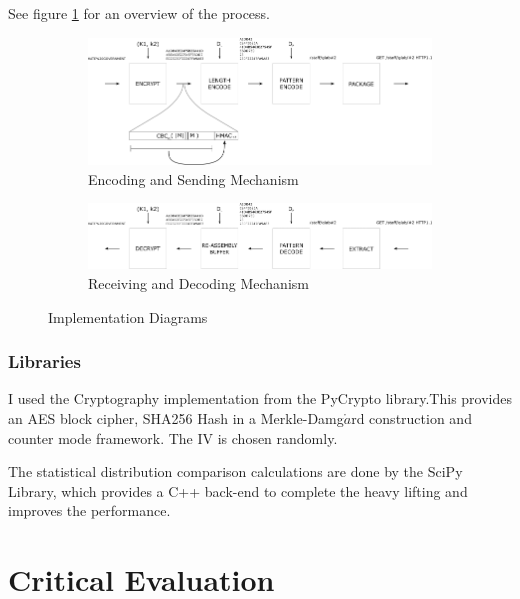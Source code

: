 \documentclass[ %
                    author={Samuel Russell},
                supervisor={Prof. Bogdan Warinschi},
                    degree={MEng},
                     title={Innocuous Ciphertexts},
                  subtitle={The DE-CENSOR Scheme},
                      type={research},
                      year={2018} ]{dissertation}
\begin{document}
See figure \ref{fig:imp-diag} for an overview of the process.

\begin{figure}
\begin{subfigure}[b]{\textwidth}
\includegraphics[scale=0.9]{diagram-enc}
\caption{Encoding and Sending Mechanism}
\end{subfigure}

\begin{subfigure}[b]{\textwidth}
\includegraphics[scale=0.9]{diagram-dec}
\caption{Receiving and Decoding Mechanism}
\end{subfigure}
\caption{Implementation Diagrams}
\label{fig:imp-diag}
\end{figure}

\subsection{Libraries}

I used the Cryptography implementation from the PyCrypto library.This provides an AES block cipher, SHA256 Hash in a Merkle-Damg$\mathring{a}$rd construction and counter mode framework. The IV is chosen randomly.

The statistical distribution comparison calculations are done by the SciPy Library, which provides a C++ back-end to complete the heavy lifting and improves the performance.


\chapter{Critical Evaluation}
\label{chap:evaluation}
\end{document}
